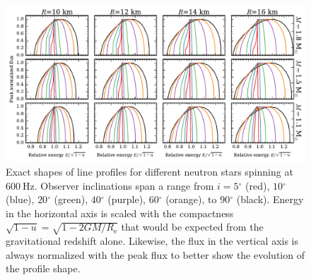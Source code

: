\documentclass{aa}
\newcommand{\Msun}{\ensuremath{M_{\odot}}}
\renewcommand{\deg}{\ensuremath{^{\circ}}}
\begin{document}

\begin{figure}[htbp!]
\centering
    \includegraphics[width=18cm]{figs/sweep_grid.pdf}
\caption{\label{fig:sweep}
    Exact shapes of line profiles for different neutron stars spinning at $600~\mathrm{Hz}$.
Observer inclinations span a range from $i=5\deg$ (red), $10\deg$ (blue), $20\deg$ (green), $40\deg$ (purple), $60\deg$ (orange), to $90\deg$ (black).
Energy in the horizontal axis is scaled with the compactness $\sqrt{1-u} = \sqrt{1-2GM/R_{\mathrm{e}}}$ that would be expected from the gravitational redshift alone.
Likewise, the flux in the vertical axis is always normalized with the peak flux to better show the evolution of the profile shape.
}
\end{figure}
\end{document}
